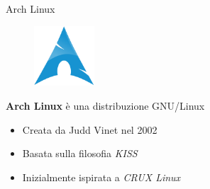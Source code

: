 \begin{frame}{Arch Linux}
    \begin{figure}[h]
        \includegraphics[width=0.2\textwidth]{images/Archlinux-icon-crystal-64.png}
    \end{figure}
    \textbf{Arch Linux} è una distribuzione GNU/Linux\\

    \begin{itemize}
        \item Creata da Judd Vinet nel 2002
        \item Basata sulla filosofia \textit{KISS}
        \item Inizialmente ispirata a \textit{CRUX Linux}
    \end{itemize}
\end{frame}


